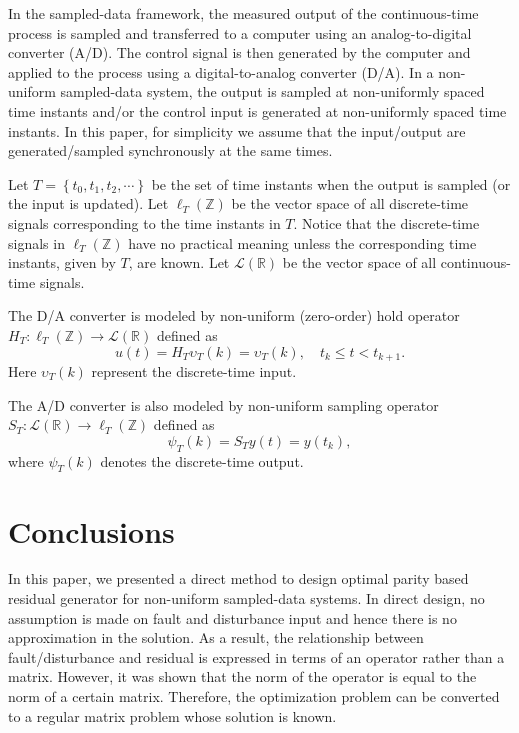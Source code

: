\documentclass[A4paper,conference]{IEEEtran}
\begin{document}
In the sampled-data framework, the measured output of the
continuous-time process is sampled and transferred to a computer
using an analog-to-digital converter (A/D). The control signal is
then generated by the computer and applied to the process using a
digital-to-analog converter (D/A). In a non-uniform sampled-data
system, the output is sampled at non-uniformly spaced time instants
and/or the control input is generated at non-uniformly spaced time
instants. In this paper, for simplicity we assume that the
input/output are generated/sampled synchronously at the same times.

Let $T=\left\{t_0,t_1,t_2,\cdots\right\}$ be the set of time
instants when the output is sampled (or the input is updated). Let
$\ell_T(\mathbb{Z})$ be the vector space of all discrete-time
signals corresponding to the time instants in $T$. Notice that the
discrete-time signals in $\ell_T(\mathbb{Z})$ have no practical
meaning unless the corresponding time instants, given by $T$, are
known. Let $\mathcal{L}(\mathbb{R})$ be the vector space of all
continuous-time signals.

The D/A converter is modeled by non-uniform (zero-order) hold
operator $H_T: \ell_T(\mathbb{Z}) \rightarrow
\mathcal{L}(\mathbb{R})$ defined as
\begin{equation*}
    u(t)=H_T \upsilon_T(k)= \upsilon_T(k), \quad t_k \leq t < t_{k+1}.
\end{equation*}
Here $\upsilon_T(k)$ represent the discrete-time input.

The A/D converter is also modeled by non-uniform sampling operator
$S_T:\mathcal{L}(\mathbb{R}) \rightarrow \ell_T(\mathbb{Z})$ defined
as
\begin{equation*}
    \psi_T(k)=S_Ty(t)=y(t_k),
\end{equation*}
where $\psi_T(k)$ denotes the discrete-time output.

\section{Conclusions}\label{sec9}
In this paper, we presented a direct method to design optimal parity
based residual generator for non-uniform sampled-data systems. In
direct design, no assumption is made on fault and disturbance input
and hence there is no approximation in the solution. As a result, 
the relationship between fault/disturbance and residual is
expressed in terms of an operator rather than a matrix. However, it
was shown that the norm of the operator is equal to the norm of a
certain matrix. Therefore, the optimization problem can be converted
to a regular matrix problem whose solution is known.
\end{document}
